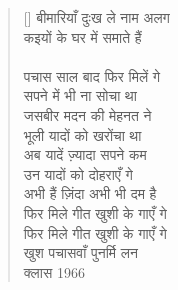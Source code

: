 \begin{verse}[\versewidth]
{बीमारियाँ दुःख ले नाम अलग\\
कइयों के घर में समाते हैं\\
\\
पचास साल बाद फिर मिलें गे\\
सपने में भी ना सोचा था\\
जसबीर मदन की मेहनत ने\\
भूली यादों को खरोंचा था\\
अब यादें ज़्यादा सपने कम\\
उन यादों को दोहराएँ गे\\
अभी हैं ज़िंदा अभी भी दम है\\
फिर मिले गीत खुशी के गाएँ गे\\
फिर मिले गीत खुशी के गाएँ गे\\
खुश पचासवाँ पुनर्मि लन\\
क्लास 1966
}\end{verse}
